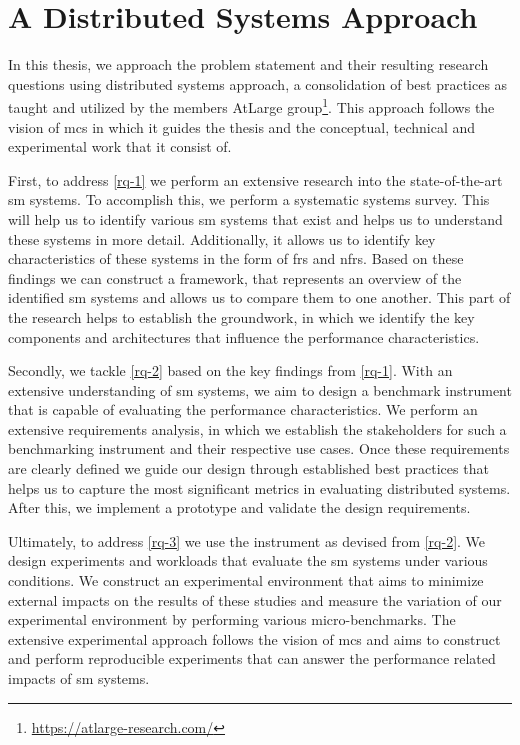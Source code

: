 \section{A Distributed Systems Approach}
\label{sec:approach}

In this thesis, we approach the problem statement and their resulting research questions using distributed systems approach, a consolidation of best practices as taught and utilized by the members AtLarge group\footnote{\url{https://atlarge-research.com/}}. This approach follows the vision of \gls{mcs} \cite{iosup2018} in which it guides the thesis and the conceptual, technical and experimental work that it consist of.

First, to address \ref{rq-1} we perform an extensive research into the state-of-the-art \gls{sm} systems. To accomplish this, we perform a systematic systems survey. This will help us to identify various \gls{sm} systems that exist and helps us to understand these systems in more detail. Additionally, it allows us to identify key characteristics of these systems in the form of \glspl{fr} and \glspl{nfr}. Based on these findings we can construct a framework, that represents an overview of the identified \gls{sm} systems and allows us to compare them to one another. This part of the research helps to establish the groundwork, in which we identify the key components and architectures that influence the performance characteristics.

Secondly, we tackle \ref{rq-2} based on the key findings from \ref{rq-1}. With an extensive understanding of \gls{sm} systems, we aim to design a benchmark instrument that is capable of evaluating the performance characteristics. We perform an extensive requirements analysis, in which we establish the stakeholders for such a benchmarking instrument and their respective use cases. Once these requirements are clearly defined we guide our design through established best practices that helps us to capture the most significant metrics in evaluating distributed systems. After this, we implement a prototype and validate the design requirements.


Ultimately, to address \ref{rq-3} we use the instrument as devised from \ref{rq-2}. We design experiments and workloads that evaluate the \gls{sm} systems under various conditions. We construct an experimental environment that aims to minimize external impacts on the results of these studies and measure the variation of our experimental environment by performing various micro-benchmarks. The extensive experimental approach follows the vision of \gls{mcs} and aims to construct and perform reproducible experiments that can answer the performance related impacts of \gls{sm} systems.